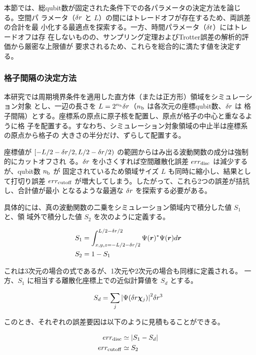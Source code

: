 \documentclass[wabun2025.tex]{subfiles}
\begin{document}
本節では、総qubit数が固定された条件下での各パラメータの決定方法を論じる。空間パ
ラメータ（$\delta r$ と $L$）の間にはトレードオフが存在するため、両誤差の合計を最
小化する最適点を探索する。一方、時間パラメータ（$\delta t$）にはトレードオフは存
在しないものの、サンプリング定理およびTrotter誤差の解析的評価から厳密な上限値が
要求されるため、これらを総合的に満たす値を決定する。

\subsubsection{格子間隔の決定方法}
\label{subsec:delta-r-selection-method}

本研究では周期境界条件を適用した直方体（または正方形）領域をシミュレーション対象
とし、一辺の長さを $L=2^{n_{\mathrm{b}}}\delta r$（$n_{\mathrm{b}}$ は各次元の座標qubit数、$\delta r$ は
格子間隔）とする。座標系の原点に原子核を配置し、原点が格子の中心と重なるように格
子を配置する。すなわち、シミュレーション対象領域の中止半は座標系の原点から格子の
大きさの半分だけ、ずらして配置する。

座標値が $[-L/2-\delta r/2, L/2-\delta r/2)$ の範囲からはみ出る波動関数の成分は強制的にカットオフされ
る。$\delta r$ を小さくすれば空間離散化誤差 $err_{\mathrm{disc}}$ は減少するが、qubit数 $n_{\mathrm{b}}$ が
固定されているため領域サイズ $L$ も同時に縮小し、結果として打切り誤差
$err_{\mathrm{cutoff}}$ が増大してしまう。したがって、これら2つの誤差が拮抗し、合計値が最小
となるような最適な $\delta r$ を探索する必要がある。

具体的には、真の波動関数の二乗をシミュレーション領域内で積分した値 $S_1$ と、領
域外で積分した値 $S_2$ を次のように定義する。

\begin{align}
S_1 &= \int_{x,y,z=-L/2-\delta r/2}^{L/2-\delta r/2}\Psi(\bm{r})^{\ast}\Psi(\bm{r}) d\bm{r} \\
S_2 &= 1 - S_1
\end{align}

これは3次元の場合の式であるが、1次元や2次元の場合も同様に定義される。
一方、$S_1$ に相当する離散化座標上での近似計算値を $S_d$ とする。

\begin{equation}
S_d = \sum_{j}{\left| \Psi(\delta r\bm{\chi}_{j}) \right|}^2 \delta r^3
\end{equation}

このとき、それぞれの誤差要因は以下のように見積もることができる。

\begin{align}
err_{\mathrm{disc}} &\simeq {\left| S_1 - S_d \right|} \label{eq:err-disc-definition}\\
err_{\mathrm{cutoff}} &\simeq S_2 \label{eq:err-cutoff-definition}
\end{align}
\end{document}
